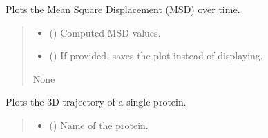 \documentclass[letterpaper,10pt,english]{sphinxmanual}
\begin{document}
\begin{fulllineitems}
\begin{fulllineitems}
\label{\detokenize{src:src.Analysis_Class.Analysis.plot_msd}}
\pysigstartsignatures
{}
\pysigstopsignatures
\sphinxAtStartPar
Plots the Mean Square Displacement (MSD) over time.
\begin{quote}\begin{description}
\begin{itemize}
\item {} 
\sphinxAtStartPar
{} () \textendash{} Computed MSD values.

\item {} 
\sphinxAtStartPar
{} (\sphinxstyleliteralemphasis{\sphinxupquote{, }}) \textendash{} If provided, saves the plot instead of displaying.

\end{itemize}

\sphinxAtStartPar
None

\end{description}\end{quote}

\end{fulllineitems}


\begin{fulllineitems}
\label{\detokenize{src:src.Analysis_Class.Analysis.plot_protein_trajectory}}
\pysigstartsignatures
{}
\pysigstopsignatures
\sphinxAtStartPar
Plots the 3D trajectory of a single protein.
\begin{quote}\begin{description}
\begin{itemize}
\item {} 
\sphinxAtStartPar
{} () \textendash{} Name of the protein.


\end{itemize}
\end{description}
\end{quote}
\end{fulllineitems}
\end{fulllineitems}
\end{document}
